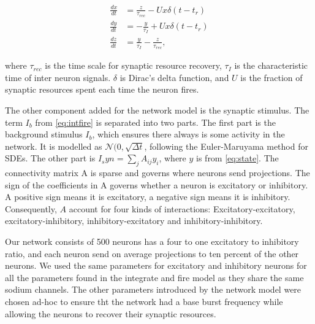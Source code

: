 \begin{align} \label{eq:state}
    \frac{dx}{dt} &= \frac{z}{\tau_{rec}} - Ux\delta(t - t_r) \\      %
    \frac{dy}{dt} &= -\frac{y}{\tau_I} + Ux\delta(t - t_r) \\
    \frac{dz}{dt} &= \frac{y}{\tau_I} - \frac{z}{\tau_{rec}},
\end{align}

where \(\tau_{rec}\) is the time scale for synaptic resource recovery, \(\tau_I\) is the
characteristic time of inter neuron signals. \(\delta\) is Dirac's delta function, and \(U\) is the
fraction of synaptic resources spent each time the neuron fires.

The other component added for the network model is the synaptic stimulus. The term \(I_b\) from
\ref{eq:intfire} is separated into two parts. The first part is the background stimulus \(I_b\),
which ensures there always is some activity in the network. It is modelled as
\(\mathcal{N}(0, \sqrt{\Delta t}\), following the Euler-Maruyama method for SDEs. The other part is
\(I_syn = \sum_{j}A_{ij}y_i\), where \(y\) is from \cref{eq:state}. The connectivity matrix A is
sparse and governs where neurons send projections. The sign of the coefficients in A governs whether
a neuron is excitatory or inhibitory. A positive sign means it is excitatory, a negative sign means
it is inhibitory. Consequently, \(A\) account for four kinds of interactions: Excitatory-excitatory,
excitatory-inhibitory, inhibitory-excitatory and inhibitory-inhibitory.

Our network consists of 500 neurons has a four to one excitatory to inhibitory ratio, and each
neuron send on average projections to ten percent of the other neurons. We used the same parameters
for excitatory and inhibitory neurons for all the parameters found in the integrate and fire model
as they share the same sodium channels. The other parameters introduced by the network model were
chosen ad-hoc to ensure tht the network had a base burst frequency while allowing the neurons to
recover their synaptic resources.


